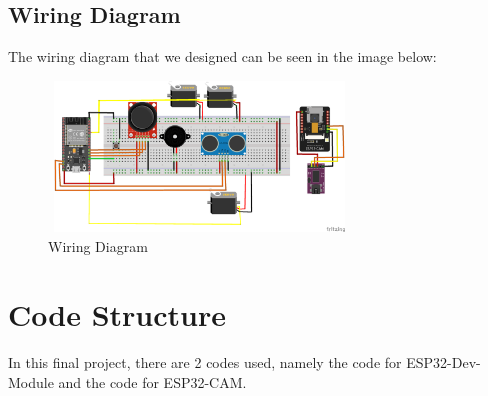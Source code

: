 \documentclass[conference]{IEEEtran}
\begin{document}
\subsection{Wiring Diagram}
The wiring diagram that we designed can be seen in the image below:
\begin{figure}[htbp]
\centerline{\includegraphics[width=8cm, height=4cm]{Lampiran/dig1.png}}
\caption{Wiring Diagram}
\label{dig}
\end{figure}

\section{Code Structure}
In this final project, there are 2 codes used, namely the code for ESP32-Dev-Module and the code for ESP32-CAM.
\end{document}
